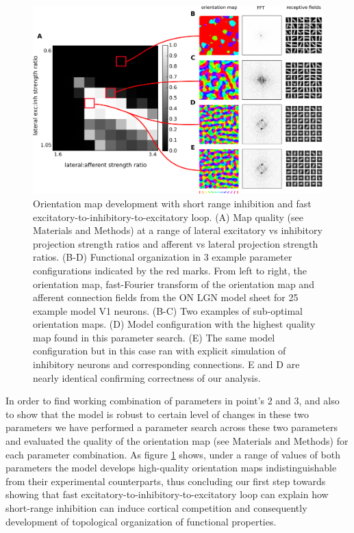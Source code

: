 \documentclass[a4paper,10pt]{article}
\begin{document}
\begin{figure}[htpb!] 
\centering
\includegraphics[width=16cm]{./SVG/Figure1/figure1.png}
\caption{Orientation map development with short range inhibition and fast excitatory-to-inhibitory-to-excitatory loop. (A) Map quality (see Materials and Methods) at a range of 
lateral excitatory vs inhibitory projection strength ratios and afferent vs lateral projection strength ratios. (B-D) Functional organization in 3 example parameter configurations 
indicated by the red marks. From left to right, the orientation map, fast-Fourier transform of the orientation map and afferent connection fields from the ON LGN model sheet for 25 example model V1 neurons. 
(B-C) Two examples of sub-optimal orientation maps. (D) Model configuration with the highest quality map found in this parameter search. 
(E) The same model configuration but in this case ran with explicit simulation of inhibitory neurons and corresponding connections. E and D are nearly identical confirming correctness of our analysis.
}
\label{fig:figure1}
\end{figure} 


In order to find working combination of parameters in point's 2 and 3, and also to show that the model is robust to certain level of changes
in these two parameters we have performed a parameter search across these two parameters and evaluated the quality of the orientation map (see Materials and Methods) for each 
parameter combination. As figure \ref{fig:figure1} shows, under a range of values of both parameters the model develops high-quality orientation maps indistinguishable
from their experimental counterparts, thus concluding our first step towards showing that fast excitatory-to-inhibitory-to-excitatory loop can explain 
how short-range inhibition can induce cortical competition and consequently development of topological organization of functional properties.
\end{document}

